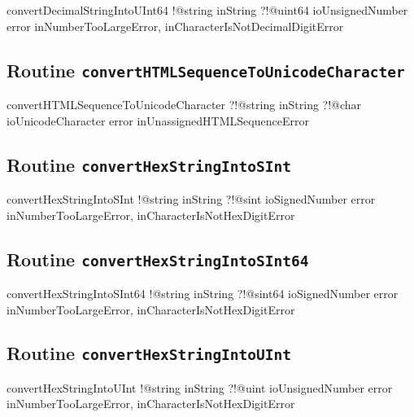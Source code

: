 \begin{galgas}
convertDecimalStringIntoUInt64 !@string inString
                               ?!@uint64 ioUnsignedNumber
                               error inNumberTooLargeError,
                                     inCharacterIsNotDecimalDigitError
\end{galgas}

\subsection{Routine \texttt{convertHTMLSequenceToUnicodeCharacter}}

\begin{galgas}
convertHTMLSequenceToUnicodeCharacter ?!@string inString
                                      ?!@char ioUnicodeCharacter
                                      error inUnassignedHTMLSequenceError
\end{galgas}

\subsection{Routine \texttt{convertHexStringIntoSInt}}

\begin{galgas}
convertHexStringIntoSInt !@string inString
                         ?!@sint ioSignedNumber
                         error inNumberTooLargeError,
                               inCharacterIsNotHexDigitError
\end{galgas}

\subsection{Routine \texttt{convertHexStringIntoSInt64}}

\begin{galgas}
convertHexStringIntoSInt64 !@string inString
                           ?!@sint64 ioSignedNumber
                           error inNumberTooLargeError,
                                 inCharacterIsNotHexDigitError
\end{galgas}

\subsection{Routine \texttt{convertHexStringIntoUInt}}

\begin{galgas}
convertHexStringIntoUInt !@string inString
                         ?!@uint ioUnsignedNumber
                         error inNumberTooLargeError,
                               inCharacterIsNotHexDigitError
\end{galgas}

